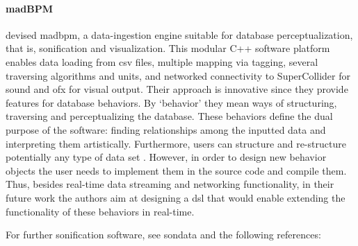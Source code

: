 \paragraph{madBPM}
\textcite{icmc/bbp2372.2017.087} devised \gls{madbpm}, a data-ingestion engine suitable for database perceptualization, that is, sonification and visualization. This modular C++ software platform enables data loading from \gls{csv} files, multiple mapping via tagging, several traversing algorithms and units, and networked connectivity to SuperCollider for sound and \gls{ofx} for visual output. Their approach is innovative since they provide features for database behaviors. By `behavior' they mean ways of structuring, traversing and perceptualizing the database. These behaviors define the dual purpose of the software: finding relationships among the inputted data and interpreting them artistically. Furthermore, users can structure and re-structure potentially any type of data set \parencite[504]{icmc/bbp2372.2017.087}. However, in order to design new behavior objects the user needs to implement them in the source code and compile them. Thus, besides real-time data streaming and networking functionality, in their future work the authors aim at designing a \gls{dsl} that would enable extending the functionality of these behaviors in real-time.

For further sonification software, see \gls{sondata} and the following references: \textcites{Wil96:Lis}{pauletto04}{Lod98:MUS}{Bei09:Aes}{Her14:Aso}{DBLP:conf/icad/2007/Worral}{DBLP:conf/icad/2003/Walker}{domenico_vicinanza_2006_849321}

